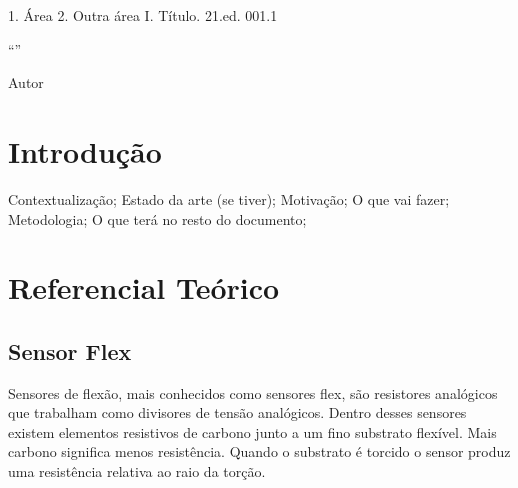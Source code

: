 \documentclass{ufpatcc}
\begin{document}
  \capa
  \folhaderosto
                     {1. Área 2. Outra área I. Título.}
                     {21.ed. 001.1}
  \begin{dedicatoria}
    \lipsum[13]
  \end{dedicatoria}
  \begin{agradecimentos}
    \lipsum[1-5]
  \end{agradecimentos}
  \begin{epigrafe}
    ``\lipsum*[101]''\par
      Autor
  \end{epigrafe}
  \begin{resumo}
    \lipsum[1]
  \end{resumo}
  \begin{abstract}
    \lipsum[1]
  \end{abstract}
  \tableofcontents

	
  \chapter{Introdução} %
		
		Contextualização; Estado da arte (se tiver); Motivação; O que vai fazer; Metodologia; O que terá no resto do documento;


	\chapter{Referencial Teórico}

		\section{Sensor Flex}
		Sensores de flexão, mais conhecidos como sensores flex, são resistores analógicos que trabalham como divisores de tensão analógicos. Dentro desses sensores existem elementos resistivos de carbono junto a um fino substrato flexível. Mais carbono significa menos resistência. Quando o substrato é torcido o sensor produz uma resistência relativa ao raio da torção. \cite{solanki2013sign}
\end{document}
